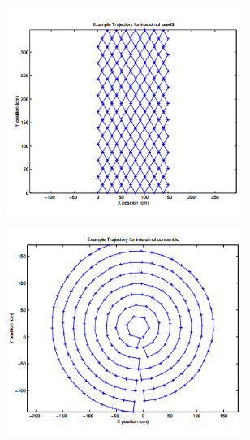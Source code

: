 \begin{figure}
    \begin{subfigure}[b]{0.498\textwidth}
		\centering
		\includegraphics[width=0.85\textwidth, height=0.85\textwidth]{images/seed.png}
		\label{subfig:a}
		\caption{}
	\end{subfigure}
	\begin{subfigure}[b]{0.498\textwidth}
	    \centering
		\includegraphics[width=0.85\textwidth, height=0.85\textwidth]{images/conc.png}
		\label{subfig:b}

\end{subfigure}
\end{figure}
